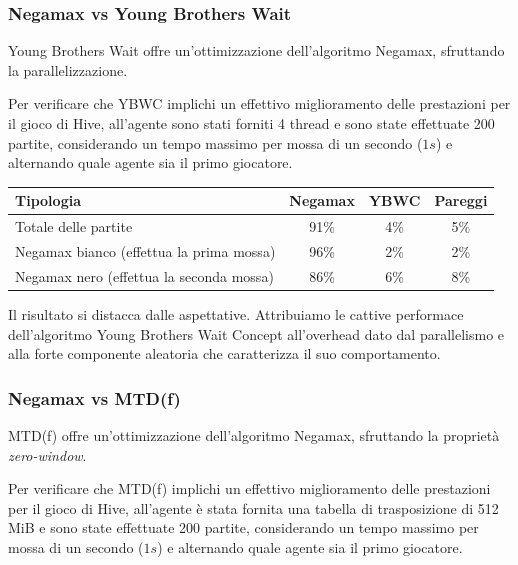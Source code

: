 \documentclass[a4paper,12pt]{article}
\begin{document}
    \newpage

    \subsubsection{Negamax vs Young Brothers Wait}
    Young Brothers Wait offre un'ottimizzazione dell'algoritmo Negamax, sfruttando la parallelizzazione.

    Per verificare che YBWC implichi un effettivo miglioramento delle prestazioni per il gioco di Hive, all'agente sono stati forniti 4 thread e sono state effettuate 200 partite, considerando un tempo massimo per mossa di un secondo ($1s$) e alternando quale agente sia il primo giocatore.

    \begin{table}[h]
        \begin{center}
            \begin{tabular}{||l|c|c|c||}
                \hline
                Tipologia                                & Negamax & YBWC & Pareggi \\ \hline
                Totale delle partite                     & 91\%    & 4\%  & 5\%     \\
                Negamax bianco (effettua la prima mossa) & 96\%    & 2\%  & 2\%     \\
                Negamax nero (effettua la seconda mossa) & 86\%    & 6\%  & 8\%     \\ \hline
            \end{tabular}
        \end{center}
    \end{table}

    Il risultato si distacca dalle aspettative. Attribuiamo le cattive performace dell'algoritmo Young Brothers Wait Concept all'overhead dato dal parallelismo e alla forte componente aleatoria che caratterizza il suo comportamento.

    \subsubsection{Negamax vs MTD(f)}
    MTD(f) offre un'ottimizzazione dell'algoritmo Negamax, sfruttando la proprietà \textit{zero-window}.

    Per verificare che MTD(f) implichi un effettivo miglioramento delle prestazioni per il gioco di Hive, all'agente è stata fornita una tabella di trasposizione di 512 MiB e sono state effettuate 200 partite, considerando un tempo massimo per mossa di un secondo ($1s$) e alternando quale agente sia il primo giocatore.
\end{document}
